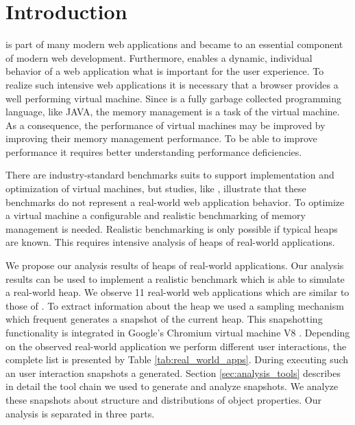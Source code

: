 
\section{Introduction}

\JS is part of many modern web applications and became to an essential
component of modern web development. Furthermore, \JS enables a dynamic,
individual behavior of a web application what is important for the user
experience. To realize such \JS intensive web applications it is necessary that
a browser provides a well performing \JS virtual machine. Since \JS is a fully
garbage collected programming language, like JAVA, the memory management is a
task of the virtual machine. As a consequence, the performance of \JS virtual
machines may be improved by improving their memory management performance. To
be able to improve performance it requires better understanding performance
deficiencies.

There are industry-standard benchmarks suits to support implementation and
optimization of \JS virtual machines, but studies, like \cite{JSMeter2009},
illustrate that these benchmarks do not represent a real-world web application
behavior. To optimize a \JS virtual machine a configurable and realistic
benchmarking of memory management is needed. Realistic benchmarking is only
possible if typical \JS heaps are known. This requires intensive analysis of
\JS heaps of real-world applications.

We propose our analysis results of \JS heaps of real-world applications. Our
analysis results can be used to implement a realistic benchmark which is able
to simulate a real-world \JS heap. We observe 11 real-world web applications
which are similar to those of \cite{JSMeter2009}. To extract information about
the \JS heap we used a sampling mechanism which frequent generates a snapshot
of the current \JS heap. This snapshotting functionality is integrated in
Google's Chromium \cite{Chromium} virtual machine V8 \cite{V8}. Depending on
the observed real-world application we perform different user interactions, the
complete list is presented by Table \ref{tab:real_world_apps}. During executing
such an user interaction snapshots a generated. Section
\ref{sec:analysis_tools} describes in detail the tool chain we used to generate
and analyze snapshots. We analyze these snapshots about structure and 
distributions of object properties. Our analysis is separated in three parts.


